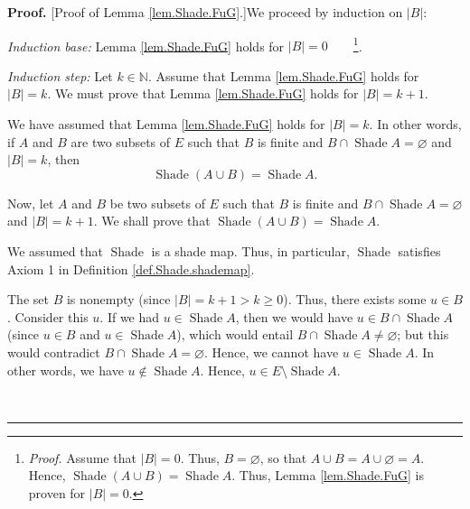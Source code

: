 \documentclass[numbers=enddot,12pt,final,onecolumn]{scrartcl}%
\theoremstyle{definition}
\newenvironment{proof}[1][Proof]{\noindent\textbf{#1.} }{\ \rule{0.5em}{0.5em}}
\newenvironment{verlong}{}{}
\renewcommand{\geq}{\geqslant}
\begin{document}
\begin{verlong}


\begin{proof}
[Proof of Lemma \ref{lem.Shade.FuG}.]We proceed by induction on $\left\vert
B\right\vert $:

\textit{Induction base:} Lemma \ref{lem.Shade.FuG} holds for $\left\vert
B\right\vert =0$\ \ \ \ \footnote{\textit{Proof.} Assume that $\left\vert
B\right\vert =0$. Thus, $B=\varnothing$, so that $A\cup B=A\cup\varnothing=A$.
Hence, $\operatorname*{Shade}\left(  A\cup B\right)  =\operatorname*{Shade}A$.
Thus, Lemma \ref{lem.Shade.FuG} is proven for $\left\vert B\right\vert =0$.}.

\textit{Induction step:} Let $k\in\mathbb{N}$. Assume that Lemma
\ref{lem.Shade.FuG} holds for $\left\vert B\right\vert =k$. We must prove that
Lemma \ref{lem.Shade.FuG} holds for $\left\vert B\right\vert =k+1$.

We have assumed that Lemma \ref{lem.Shade.FuG} holds for $\left\vert
B\right\vert =k$. In other words, if $A$ and $B$ are two subsets of $E$ such
that $B$ is finite and $B\cap\operatorname*{Shade}A=\varnothing$ and
$\left\vert B\right\vert =k$, then%
\begin{equation}
\operatorname*{Shade}\left(  A\cup B\right)  =\operatorname*{Shade}A.
\label{pf.lem.Shade.FuG.IH}%
\end{equation}


Now, let $A$ and $B$ be two subsets of $E$ such that $B$ is finite and
$B\cap\operatorname*{Shade}A=\varnothing$ and $\left\vert B\right\vert =k+1$.
We shall prove that $\operatorname*{Shade}\left(  A\cup B\right)
=\operatorname*{Shade}A$.

We assumed that $\operatorname*{Shade}$ is a shade map. Thus, in particular,
$\operatorname*{Shade}$ satisfies Axiom 1 in Definition
\ref{def.Shade.shademap}.

The set $B$ is nonempty (since $\left\vert B\right\vert =k+1>k\geq0$). Thus,
there exists some $u\in B$. Consider this $u$. If we had $u\in
\operatorname*{Shade}A$, then we would have $u\in B\cap\operatorname*{Shade}A$
(since $u\in B$ and $u\in\operatorname*{Shade}A$), which would entail
$B\cap\operatorname*{Shade}A\neq\varnothing$; but this would contradict
$B\cap\operatorname*{Shade}A=\varnothing$. Hence, we cannot have
$u\in\operatorname*{Shade}A$. In other words, we have $u\notin%
\operatorname*{Shade}A$. Hence, $u\in E\setminus\operatorname*{Shade}A$.


\end{proof}
\end{verlong}
\end{document}
